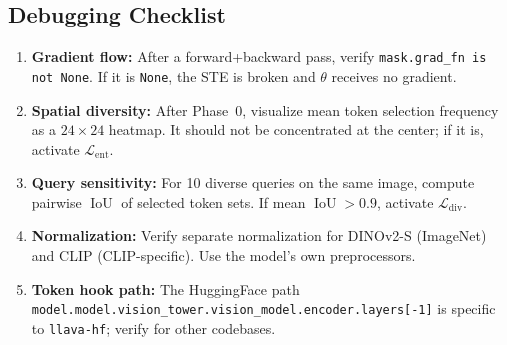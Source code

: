\documentclass[11pt,a4paper]{article}
\DeclareMathOperator{\IoU}{IoU}
\begin{document}
\subsection{Debugging Checklist}

\begin{enumerate}[leftmargin=2em, itemsep=2pt]
  \item \textbf{Gradient flow:} After a forward+backward pass, verify
    \texttt{mask.grad\_fn is not None}. If it is \texttt{None}, the STE is
    broken and $\theta$ receives no gradient.
  \item \textbf{Spatial diversity:} After Phase~0, visualize mean token selection
    frequency as a $24{\times}24$ heatmap. It should not be concentrated at the
    center; if it is, activate $\mathcal{L}_{\mathrm{ent}}$.
  \item \textbf{Query sensitivity:} For 10 diverse queries on the same image,
    compute pairwise $\IoU$ of selected token sets. If mean $\IoU > 0.9$,
    activate $\mathcal{L}_{\mathrm{div}}$.
  \item \textbf{Normalization:} Verify separate normalization for DINOv2-S
    (ImageNet) and CLIP (CLIP-specific). Use the model's own preprocessors.
  \item \textbf{Token hook path:} The HuggingFace path
    \texttt{model.model.vision\_tower.vision\_model.encoder.layers[-1]}
    is specific to \texttt{llava-hf}; verify for other codebases.
\end{enumerate}

\end{document}
